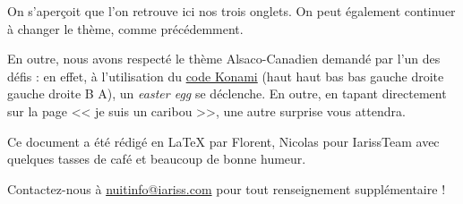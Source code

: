 \documentclass[12pt, a4paper]{article}
\newcommand{\espace}{\vspace{.8cm}}
\newcommand{\authors}{Florent, Nicolas}
\begin{document}
\espace{}
On s'aperçoit que l'on retrouve ici nos trois onglets. On peut également continuer à changer le thème, comme précédemment.

\espace{}
En outre, nous avons respecté le thème Alsaco-Canadien demandé par l'un des défis : en effet, à l'utilisation du \href{http://fr.wikipedia.org/wiki/Code_Konami}{code Konami} (haut haut bas bas gauche droite gauche droite B A), un \emph{easter egg} se déclenche. En outre, en tapant directement sur la page << je suis un caribou >>, une autre surprise vous attendra.


\espace\vfill{}
Ce document a été rédigé en \LaTeX{} par \authors{} pour IarissTeam avec quelques tasses de café et beaucoup de bonne humeur.

Contactez-nous à \href{mailto:nuitinfo@iariss.com}{nuitinfo@iariss.com} pour tout renseignement supplémentaire !
\end{document}
